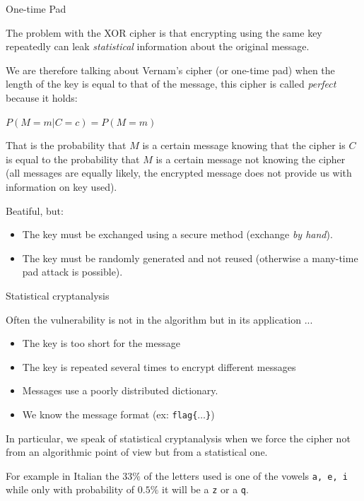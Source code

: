 \documentclass[handout, xcolor=dvipsnames,aspectratio=169]{beamer}
\begin{document}
\begin{frame}{One-time Pad}

  \pause

  The problem with the XOR cipher is that encrypting using the same key repeatedly can leak \textit{statistical} information about the original message.
  \medskip

  \pause
  We are therefore talking about Vernam's cipher (or one-time pad) when the length of the key is equal to that of the message, this cipher is called \textit{perfect} because it holds:
  \medskip

  $P(M = m | C = c) = P(M = m)$

  \medskip

  That is the probability that $ M $ is a certain message knowing that the cipher is $ C $ is equal to the probability that $ M $ is a certain message not knowing the cipher (all messages are equally likely, the encrypted message does not provide us with information on key used).

  \medskip

  \pause

  Beatiful, but:

  \begin{itemize}
    \item The key must be exchanged using a secure method (exchange \textit{by hand}).
    \item The key must be randomly generated and not reused (otherwise a many-time pad attack is possible).
  \end{itemize}

\end{frame}


\begin{frame}{Statistical cryptanalysis}

  \pause

  Often the vulnerability is not in the algorithm but in its application ...

  \pause

  \medskip

  \begin{itemize}
    \item The key is too short for the message
    \item The key is repeated several times to encrypt different messages
    \item Messages use a poorly distributed dictionary.
    \item We know the message format (ex: \texttt{flag\{$\ldots$\}})
  \end{itemize}

  \medskip

  \pause

  In particular, we speak of statistical cryptanalysis when we force the cipher not from an algorithmic point of view but from a statistical one.

  \pause

  For example in Italian the $33\%$ of the letters used is one of the vowels \texttt{a, e, i} while only with probability of $0.5\% $ it will be a \texttt{z} or a \texttt{q}.

\end{frame}
\end{document}
